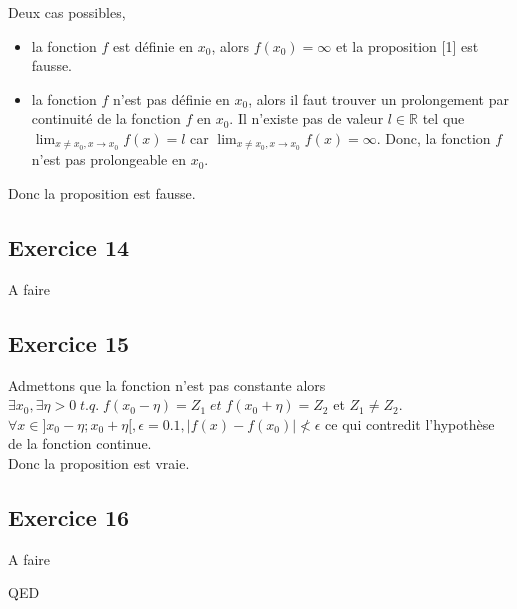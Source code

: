 \documentclass[]{book}
\theoremstyle{definition}
\newcommand{\bb}[1]{\mathbb{#1}}
\newcommand{\R}{\bb{R}}
\begin{document}
Deux cas possibles, 
\begin{itemize}
\item la fonction $f$ est d\'efinie en $x_0$, alors $f(x_0) = \infty$ et la proposition [1] est fausse.
\item la fonction $f$ n'est pas d\'efinie en $x_0$, alors il faut trouver un prolongement par continuit\'e de la fonction $f$ en $x_0$. Il n'existe pas de valeur $l \in \R$ tel que $\lim_{x \neq x_0, x \to x_0} f(x) = l$ car $\lim_{x \neq x_0, x \to x_0} f(x) = \infty$. Donc,  la fonction $f$ n'est pas prolongeable en $x_0$.
\end{itemize}


Donc la proposition est fausse.


\subsection*{Exercice 14}
A faire

\subsection*{Exercice 15}
Admettons que la fonction n'est pas constante alors $\exists x_0, \exists \eta > 0\; t.q.\; f(x_0 - \eta) = Z_1\; et \; f(x_0 + \eta) = Z_2$ et $Z_1 \neq Z_2$.\\


$\forall x \in ]x_0 - \eta;x_0 + \eta[, \epsilon = 0.1, |f(x) - f(x_0)| \nless \epsilon$ ce qui contredit l'hypoth\`ese de la fonction continue.\\

Donc la proposition est vraie.

\subsection*{Exercice 16}
A faire

QED
\end{document}
